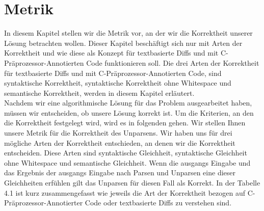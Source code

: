 \chapter{Metrik}




In diesem Kapitel stellen wir die Metrik vor, an der wir die Korrektheit unserer Lösung betrachten wollen. Dieser Kapitel beschäftigt sich nur mit Arten der Korrektheit und wie diese als Konzept für textbasierte Diffs und mit C-Präprozessor-Annotierten Code funktionieren soll. Die drei Arten der Korrektheit für textbasierte Diffs und mit C-Präprozessor-Annotierten Code, sind syntaktische Korrektheit, syntaktische Korrektheit ohne Whitespace und semantische Korrektheit, werden in diesem Kapitel erläutert.\\


Nachdem wir eine algorithmische Lösung für das Problem ausgearbeitet haben, müssen wir entscheiden, ob unsere Lösung korrekt ist. Um die Kriterien, an den die Korrektheit festgelegt wird, wird es in folgenden gehen. Wir stellen Ihnen unsere Metrik für die Korrektheit des Unparsens. Wir haben uns für drei mögliche Arten der Korrektheit entschieden, an denen wir die Korrektheit entscheiden. Diese Arten sind syntaktische Gleichheit, syntaktische Gleichheit ohne Whitespace und semantische Gleichheit. Wenn die ausgangs Eingabe und das Ergebnis der ausgangs Eingabe nach Parsen und Unparsen eine dieser Gleichheiten erfühlen gilt das Unparsen für diesen Fall als Korrekt. In der Tabelle 4.1 ist kurz zusammengefasst wie jeweils die Art der Korrektheit bezogen auf C-Präprozessor-Annotierter Code oder textbasierte Diffs zu verstehen sind.

